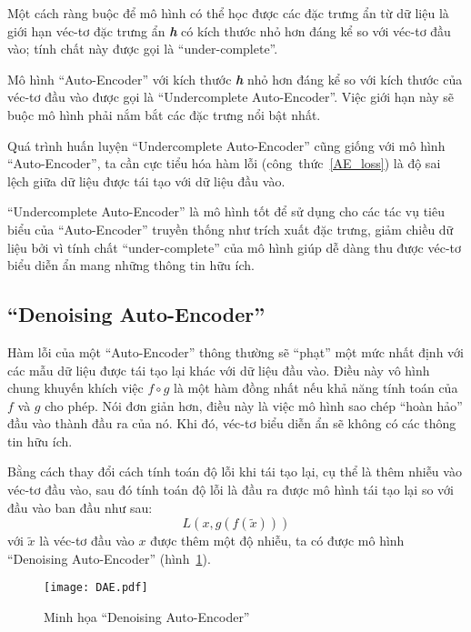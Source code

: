     Một cách ràng buộc để mô hình có thể học được các đặc trưng ẩn từ dữ liệu
    là giới hạn véc-tơ đặc trưng ẩn \textbf{\textit{h}} có kích thước nhỏ hơn đáng kể so với véc-tơ đầu vào;
    tính chất này được gọi là ``under-complete''.
    
    Mô hình ``Auto-Encoder'' với kích thước \textbf{\textit{h}} nhỏ hơn đáng kể so với kích thước của véc-tơ đầu vào
    được gọi là ``Undercomplete Auto-Encoder''. Việc giới hạn này sẽ buộc mô hình phải nắm bắt các đặc trưng
    nổi bật nhất.

    Quá trình huấn luyện ``Undercomplete Auto-Encoder'' cũng giống với mô hình ``Auto-Encoder'',
    ta cần cực tiểu hóa hàm lỗi (công~thức~\ref{AE_loss}) là độ sai lệch giữa dữ liệu được tái tạo
    với dữ liệu đầu vào.

    ``Undercomplete Auto-Encoder'' là mô hình tốt để sử dụng cho các tác vụ tiêu biểu của ``Auto-Encoder'' truyền thống
    như trích xuất đặc trưng, giảm chiều dữ liệu 
    bởi vì tính chất ``under-complete'' của mô hình giúp dễ dàng thu được véc-tơ biểu diễn ẩn mang những thông tin hữu ích.


    \subsection{``Denoising Auto-Encoder''}
    \label{chap2/subsec12}
    
    Hàm lỗi của một ``Auto-Encoder'' thông thường sẽ ``phạt'' một mức nhất định với các mẫu dữ liệu được tái tạo lại
    khác với dữ liệu đầu vào. Điều này vô hình chung khuyến khích việc 
    \begin{math}
        f \circ g
    \end{math}
    là một hàm đồng nhất nếu khả năng tính toán của 
    \begin{math}
        f
    \end{math} 
    và
    \begin{math}
        g
    \end{math}
    cho phép. Nói đơn giản hơn, điều này là việc mô hình sao chép ``hoàn hảo'' đầu vào thành đầu ra của nó.
    Khi đó, véc-tơ biểu diễn ẩn sẽ không có các thông tin hữu ích. 

    Bằng cách thay đổi cách tính toán độ lỗi khi tái tạo lại, cụ thể là thêm nhiễu vào véc-tơ đầu vào, 
    sau đó tính toán độ lỗi là đầu ra được mô hình tái tạo lại so với đầu vào ban đầu như sau:
    \begin{equation}
        L(x, g(f(\tilde{x})))
    \end{equation}
    với 
    \begin{math} \tilde{x} \end{math}
    là véc-tơ đầu vào 
    \begin{math}
        x
    \end{math} 
    được thêm một độ nhiễu, ta có được mô hình ``Denoising Auto-Encoder'' (hình~\ref{fig_DAE}). 
    \begin{figure}
        \centering
        \texttt{[image: DAE.pdf]}
        \caption{Minh họa ``Denoising Auto-Encoder''}
        \label{fig_DAE}
    \end{figure}
    
